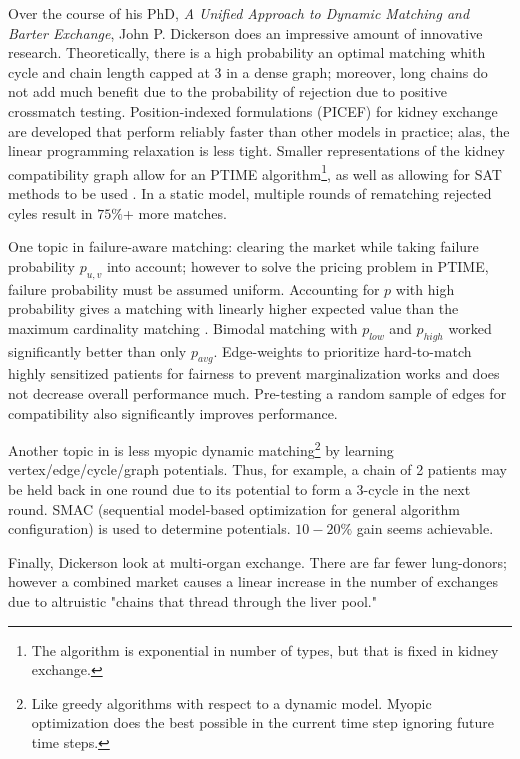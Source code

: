 \documentclass[main.tex]{subfiles}
\begin{document}
Over the course of his PhD, \textit{A Unified Approach to Dynamic Matching and Barter Exchange}, John P. Dickerson \cite{Dick} does an impressive amount of innovative research. Theoretically, there is a high probability an optimal matching whith cycle and chain length capped at 3 in a dense graph; moreover, long chains do not add much benefit due to the probability of rejection due to positive crossmatch testing. Position-indexed formulations (PICEF) for kidney exchange \cite{Dick} \cite{Dick1} are developed that perform reliably faster than other models in practice; alas, the linear programming relaxation is less tight. Smaller representations of the kidney compatibility graph allow for an PTIME algorithm\footnote{The algorithm is exponential in number of types, but that is fixed in kidney exchange.}, as well as allowing for SAT methods to be used \cite{Dick} \cite{Dick2}. In a static model, multiple rounds of rematching rejected cyles result in $75\%$+ more matches.

One topic in \cite{Dick} failure-aware matching: clearing the market while taking failure probability $p_{u,v}$ into account; however to solve the pricing problem in PTIME, failure probability must be assumed uniform. Accounting for $p$ with high probability gives a matching with linearly higher expected value than the maximum cardinality matching \cite{Dick} \cite{Dick3}. Bimodal matching with $p_{low}$ and $p_{high}$ worked significantly better than only $p_{avg}$. Edge-weights to prioritize hard-to-match highly sensitized patients for fairness to prevent marginalization works and does not decrease overall performance much. Pre-testing a random sample of edges for compatibility also significantly improves performance.

Another topic in \cite{Dick} is less myopic dynamic matching\footnote{Like greedy algorithms with respect to a dynamic model. Myopic optimization does the best possible in the current time step ignoring future time steps.} by learning vertex/edge/cycle/graph potentials. Thus, for example, a chain of 2 patients may be held back in one round due to its potential to form a 3-cycle in the next round. SMAC (sequential model-based optimization for general algorithm configuration) \cite{Hut1} is used to determine potentials. $10-20\%$ gain seems achievable.

Finally, Dickerson \cite{Dick} \cite{Dick4} look at multi-organ exchange. There are far fewer lung-donors; however a combined market causes a linear increase in the number of exchanges due to altruistic "chains that thread through the liver pool."
\end{document}
